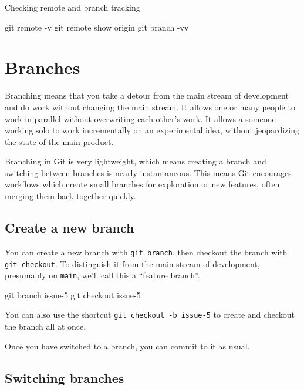\documentclass[
]{book}
\newenvironment{Shaded}{\begin{snugshade}}{\end{snugshade}}
\newcommand{\NormalTok}[1]{#1}
\begin{document}
Checking remote and branch tracking

\begin{Shaded}
\begin{Highlighting}[]
\NormalTok{git remote {-}v}
\NormalTok{git remote show origin}
\NormalTok{git branch {-}vv}
\end{Highlighting}
\end{Shaded}

\chapter{Branches}\label{git-branches}

Branching means that you take a detour from the main stream of development and
do work without changing the main stream.
It allows one or many people to work in parallel without overwriting each other's work.
It allows a someone working solo to work incrementally on an experimental idea, without jeopardizing the state of the main product.

Branching in Git is very lightweight, which means creating a branch and
switching between branches is nearly instantaneous.
This means Git encourages workflows which create small branches for exploration or new features, often merging them back together quickly.

\section{Create a new branch}\label{create-a-new-branch}

You can create a new branch with \texttt{git\ branch}, then checkout the branch with \texttt{git\ checkout}.
To distinguish it from the main stream of development, presumably on \texttt{main}, we'll call this a ``feature branch''.

\begin{Shaded}
\begin{Highlighting}[]
\NormalTok{git branch issue{-}5}
\NormalTok{git checkout issue{-}5}
\end{Highlighting}
\end{Shaded}

You can also use the shortcut \texttt{git\ checkout\ -b\ issue-5} to create and checkout the branch all at once.

Once you have switched to a branch, you can commit to it as usual.

\section{Switching branches}\label{switching-branches}
\end{document}
